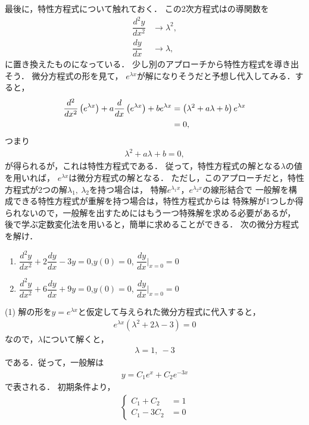 最後に，特性方程式について触れておく．
この2次方程式はの導関数を
\begin{align}
 \dfrac{d^{2}y}{dx^{2}} & \to \lambda^{2}, \\
 \dfrac{dy}{dx}         & \to \lambda, 
\end{align}
に置き換えたものになっている．
少し別のアプローチから特性方程式を導き出そう．
微分方程式の形を見て，
$e^{\lambda x}$が解になりそうだと予想し代入してみる．すると，
\begin{align}
  \dfrac{d^{2}}{dx^{2}}\left(e^{\lambda x}\right)+a\dfrac{d}{dx}\left(e^{\lambda x}\right)+be^{\lambda x} & =\left(\lambda^{2}+a\lambda+b\right)e^{\lambda x}\notag \\
 & =0,
\end{align}
つまり
\begin{align}
  \lambda^2 + a \lambda + b = 0, 
\end{align}
が得られるが，これは特性方程式である．
従って，特性方程式の解となる$\lambda$の値を用いれば，
$e^{\lambda x}$は微分方程式の解となる．
ただし，このアプローチだと，特性方程式が2つの解$\lambda_1,~\lambda_2$を持つ場合は，
特解$e^{\lambda_1 x}$，$e^{\lambda_2 x}$の線形結合で
一般解を構成できる特性方程式が重解を持つ場合は，特性方程式からは
特殊解が1つしか得られないので，一般解を出すためにはもう一つ特殊解を求める必要があるが，
後で学ぶ定数変化法を用いると，簡単に求めることができる．
%
\newpage
\gl
\reidai
次の微分方程式を解け．
\begin{enumerate}[(1)]
  \item $\dfrac{d^2y}{dx^2} + 2 \dfrac{dy}{dx} - 3y = 0$,\quad $y(0)=0$, \quad $\dfrac{dy}{dx}\biggr|_{x=0} = 0$
  \item $\dfrac{d^2y}{dx^2} + 6 \dfrac{dy}{dx} + 9y = 0$,\quad $y(0)=0$, \quad $\dfrac{dy}{dx}\biggr|_{x=0} = 0$ 
\end{enumerate}
\gl
%
(1) 解の形を$y=e^{\lambda x}$と仮定して与えられた微分方程式に代入すると，
\begin{align}
  e^{\lambda x}\left(\lambda^2 + 2\lambda - 3\right) = 0 
\end{align}
なので，$\lambda$について解くと，
\begin{align}
 \lambda = 1,~ -3 
\end{align}
である．従って，一般解は
\begin{align}
 y = C_{1}e^{x} + C_{2}e^{-3x} 
\end{align}
で表される．
初期条件より，
\begin{align}
  \begin{cases}
    C_1 + C_2   &= 1 \\
    C_1 - 3C_2  &= 0 
  \end{cases}
\end{align}
